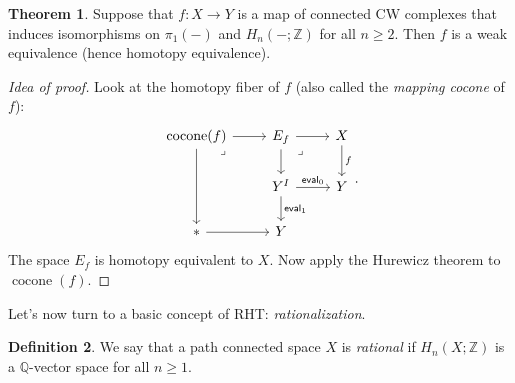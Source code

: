 \documentclass[10pt,letterpaper,cm]{nupset}
\theoremstyle{definition}
\newtheorem{defn}{Definition}[subsection]
\theoremstyle{theorem}
\newtheorem{theorem}[defn]{Theorem}
\theoremstyle{remark}
\newcommand{\eval}{\mathsf{eval}}
\newcommand{\Q}{\mathbb Q}
\newcommand{\Z}{\mathbb Z}
\newcommand{\1}{\mathbb{1}}
\newcommand{\0}{\vec 0}
\DeclareMathOperator{\cocone}{cocone}
\begin{document}
\begin{theorem}\label{easier}
Suppose that $f: X \to Y$ is a map of connected CW complexes that induces isomorphisms on $\pi_1({-})$ and $H_n({-};\Z)$ for all $n\geq 2$. Then $f$ is a weak equivalence (hence homotopy equivalence). 
\end{theorem}
\begin{proof}[Idea of proof]
Look at the homotopy fiber of $f$ (also called the \textit{mapping cocone} of $f$):
\[\begin{tikzcd}
	{\cocone(f)} & {E_f} & X \\
	& {Y^I} & Y \\
	\ast & Y
	\arrow[from=1-1, to=3-1]
	\arrow[from=3-1, to=3-2]
	\arrow[from=1-1, to=1-2]
	\arrow["{\eval_1}", from=2-2, to=3-2]
	\arrow[from=1-2, to=1-3]
	\arrow["\lrcorner"{anchor=center, pos=0.125}, draw=none, from=1-1, to=2-2]
	\arrow["\lrcorner"{anchor=center, pos=0.125}, draw=none, from=1-2, to=2-3]
	\arrow["f", from=1-3, to=2-3]
	\arrow["{\eval_0}", from=2-2, to=2-3]
	\arrow[from=1-2, to=2-2]
\end{tikzcd}.\]   The space $E_f$ is homotopy equivalent to $X$. Now apply the Hurewicz theorem to $\cocone(f)$.
\end{proof}

\medskip

Let's now turn to a basic concept of RHT: \textit{rationalization}.

\begin{defn}
We say that a path connected space $X$ is \textit{rational} if $H_n(X;\Z)$ is a $\Q$-vector space for all $n\geq 1$.
\end{defn}
\end{document}
